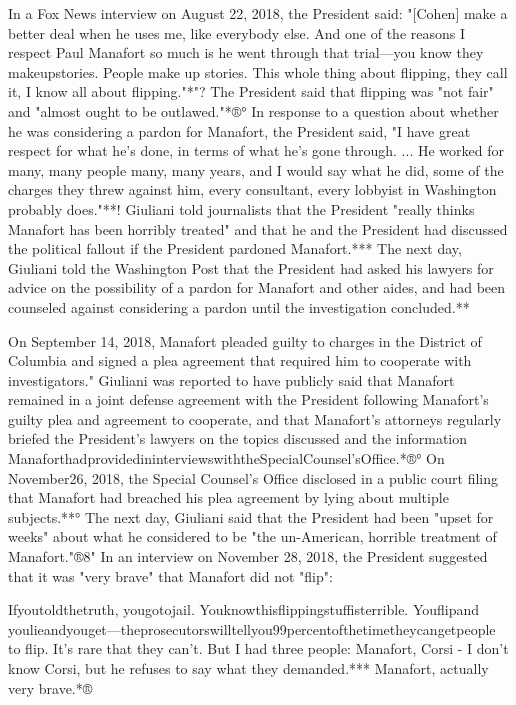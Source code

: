 In a Fox News interview on August 22, 2018, the President said: "[Cohen] make a better deal when he uses me, like everybody else.
And one of the reasons I respect Paul Manafort so much is he went through that trial—you know they makeupstories.
People make up stories.
This whole thing about flipping, they call it, I know all about flipping."*"?
The President said that flipping was "not fair" and "almost ought to be outlawed."*®°
In response to a question about whether he was considering a pardon for Manafort, the President said, "I have great respect for what he's done, in terms of what he's gone through. ...
He worked for many, many people many, many years, and I would say what he did, some of the charges they threw against him, every consultant, every lobbyist in Washington probably does."**!
Giuliani told journalists that the President "really thinks Manafort has been horribly treated" and that he and the President had discussed the political fallout if the President pardoned Manafort.***
The next day, Giuliani told the Washington Post that the President had asked his lawyers for advice on the possibility of a pardon for Manafort and other aides, and had been counseled against considering a pardon until the investigation concluded.**

On September 14, 2018, Manafort pleaded guilty to charges in the District of Columbia and signed a plea agreement that required him to cooperate with investigators."
Giuliani was reported to have publicly said that Manafort remained in a joint defense agreement with the President following Manafort's guilty plea and agreement to cooperate, and that Manafort's attorneys regularly briefed the President's lawyers on the topics discussed and the information ManaforthadprovidedininterviewswiththeSpecialCounsel'sOffice.*®°
On November26, 2018, the Special Counsel's Office disclosed in a public court filing that Manafort had breached his plea agreement by lying about multiple subjects.**°
The next day, Giuliani said that the President had been "upset for weeks" about what he considered to be "the un-American, horrible treatment of Manafort."®8"
In an interview on November 28, 2018, the President suggested that it was "very brave" that Manafort did not "flip":

Ifyoutoldthetruth, yougotojail.
Youknowthisflippingstuffisterrible.
Youflipand youlieandyouget—theprosecutorswilltellyou99percentofthetimetheycangetpeople to flip.
It's rare that they can't.
But I had three people: Manafort, Corsi - I don't know Corsi, but he refuses to say what they demanded.***
Manafort, actually very brave.*®

